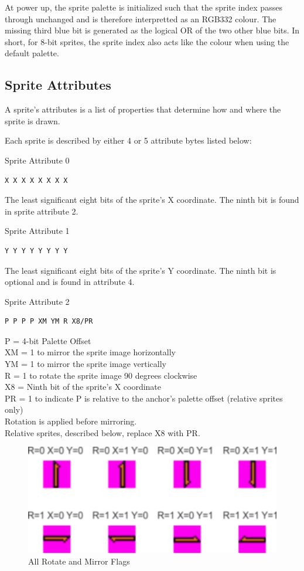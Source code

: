 At power up, the sprite palette is initialized such that the sprite
index passes through unchanged and is therefore interpretted as an
RGB332 colour. The missing third blue bit is generated as the logical
OR of the two other blue bits. In short, for 8-bit sprites, the sprite
index also acts like the colour when using the default palette.

\subsection{Sprite Attributes}
A sprite’s attributes is a list of properties that determine how and
where the sprite is drawn.

Each sprite is described by either 4 or 5 attribute bytes listed
below:

Sprite Attribute 0
\begin{verbatim}
X X X X X X X X
\end{verbatim}
The least significant eight bits of the sprite’s X coordinate. The
ninth bit is found in sprite attribute 2.

Sprite Attribute 1
\begin{verbatim}
Y Y Y Y Y Y Y Y
\end{verbatim}
The least significant eight bits of the sprite’s Y coordinate. The
ninth bit is optional and is found in attribute 4.

Sprite Attribute 2
\begin{verbatim}
P P P P XM YM R X8/PR
\end{verbatim}
P = 4-bit Palette Offset\\
XM = 1 to mirror the sprite image horizontally\\
YM = 1 to mirror the sprite image vertically\\
R = 1 to rotate the sprite image 90 degrees clockwise\\
X8 = Ninth bit of the sprite’s X coordinate\\
PR = 1 to indicate P is relative to the anchor’s palette offset
(relative sprites only)\\
Rotation is applied before mirroring.\\
Relative sprites, described below, replace X8 with PR.

\begin{figure}\centering
  \includegraphics{video/flags.png}
  \caption{All Rotate and Mirror Flags}
\end{figure}

